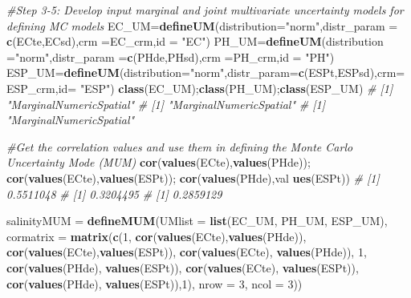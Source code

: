 \documentclass[
  10pt,
  b5paper,
]{book}
\newenvironment{Shaded}{\begin{snugshade}}{\end{snugshade}}
\newcommand{\CommentTok}[1]{\textcolor[rgb]{0.56,0.35,0.01}{\textit{#1}}}
\newcommand{\DataTypeTok}[1]{\textcolor[rgb]{0.13,0.29,0.53}{#1}}
\newcommand{\DecValTok}[1]{\textcolor[rgb]{0.00,0.00,0.81}{#1}}
\newcommand{\KeywordTok}[1]{\textcolor[rgb]{0.13,0.29,0.53}{\textbf{#1}}}
\newcommand{\NormalTok}[1]{#1}
\newcommand{\StringTok}[1]{\textcolor[rgb]{0.31,0.60,0.02}{#1}}
\begin{document}
\begin{Shaded}
\begin{Highlighting}[]
\CommentTok{#Step 3-5: Develop input marginal and joint multivariate uncertainty models for defining MC models}
\NormalTok{EC_UM=}\KeywordTok{defineUM}\NormalTok{(}\DataTypeTok{distribution=}\StringTok{"norm"}\NormalTok{,}\DataTypeTok{distr_param =} \KeywordTok{c}\NormalTok{(ECte,ECsd),}\DataTypeTok{crm =}\NormalTok{EC_crm,}\DataTypeTok{id =} \StringTok{"EC"}\NormalTok{)}
\NormalTok{PH_UM=}\KeywordTok{defineUM}\NormalTok{(}\DataTypeTok{distribution =}\StringTok{"norm"}\NormalTok{,}\DataTypeTok{distr_param =}\KeywordTok{c}\NormalTok{(PHde,PHsd),}\DataTypeTok{crm =}\NormalTok{PH_crm,}\DataTypeTok{id =} \StringTok{"PH"}\NormalTok{)}
\NormalTok{ESP_UM=}\KeywordTok{defineUM}\NormalTok{(}\DataTypeTok{distribution=}\StringTok{"norm"}\NormalTok{,}\DataTypeTok{distr_param=}\KeywordTok{c}\NormalTok{(ESPt,ESPsd),}\DataTypeTok{crm=}\NormalTok{ESP_crm,}\DataTypeTok{id=} \StringTok{"ESP"}\NormalTok{)}
\KeywordTok{class}\NormalTok{(EC_UM);}\KeywordTok{class}\NormalTok{(PH_UM);}\KeywordTok{class}\NormalTok{(ESP_UM)}
\CommentTok{# [1] "MarginalNumericSpatial"}
\CommentTok{# [1] "MarginalNumericSpatial"}
\CommentTok{# [1] "MarginalNumericSpatial"}


\CommentTok{#Get the correlation values and use them in defining the Monte Carlo Uncertainty Mode (MUM)}
\KeywordTok{cor}\NormalTok{(}\KeywordTok{values}\NormalTok{(ECte),}\KeywordTok{values}\NormalTok{(PHde)); }\KeywordTok{cor}\NormalTok{(}\KeywordTok{values}\NormalTok{(ECte),}\KeywordTok{values}\NormalTok{(ESPt)); }\KeywordTok{cor}\NormalTok{(}\KeywordTok{values}\NormalTok{(PHde),val }\KeywordTok{ues}\NormalTok{(ESPt))}
\CommentTok{# [1] 0.5511048}
\CommentTok{# [1] 0.3204495}
\CommentTok{# [1] 0.2859129}

\NormalTok{salinityMUM =}\StringTok{ }\KeywordTok{defineMUM}\NormalTok{(}\DataTypeTok{UMlist =} \KeywordTok{list}\NormalTok{(EC_UM, PH_UM, ESP_UM), }\DataTypeTok{cormatrix =} 
                          \KeywordTok{matrix}\NormalTok{(}\KeywordTok{c}\NormalTok{(}\DecValTok{1}\NormalTok{, }\KeywordTok{cor}\NormalTok{(}\KeywordTok{values}\NormalTok{(ECte),}\KeywordTok{values}\NormalTok{(PHde)), }
                                \KeywordTok{cor}\NormalTok{(}\KeywordTok{values}\NormalTok{(ECte),}\KeywordTok{values}\NormalTok{(ESPt)),}
                                \KeywordTok{cor}\NormalTok{(}\KeywordTok{values}\NormalTok{(ECte), }\KeywordTok{values}\NormalTok{(PHde)), }
                                \DecValTok{1}\NormalTok{, }\KeywordTok{cor}\NormalTok{(}\KeywordTok{values}\NormalTok{(PHde), }\KeywordTok{values}\NormalTok{(ESPt)), }
                                \KeywordTok{cor}\NormalTok{(}\KeywordTok{values}\NormalTok{(ECte), }\KeywordTok{values}\NormalTok{(ESPt)), }
                                \KeywordTok{cor}\NormalTok{(}\KeywordTok{values}\NormalTok{(PHde), }\KeywordTok{values}\NormalTok{(ESPt)),}\DecValTok{1}\NormalTok{), }
                                \DataTypeTok{nrow =} \DecValTok{3}\NormalTok{, }\DataTypeTok{ncol =} \DecValTok{3}\NormalTok{))}


\end{Highlighting}
\end{Shaded}
\end{document}
